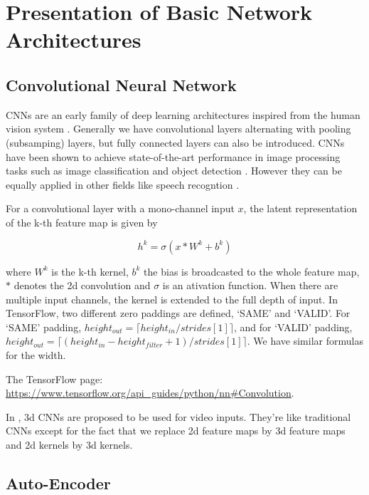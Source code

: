 \section{Presentation of Basic Network Architectures}
\label{section:networks}

\subsection{Convolutional Neural Network}

CNNs are an early family of deep learning
architectures inspired from the human vision system \cite{Y. LeCun 1998}.
Generally we have convolutional layers alternating with pooling
(subsamping) layers, but fully connected layers can also be introduced.
CNNs have been shown to achieve state-of-the-art performance in
image processing tasks such as image classification
\cite{A. Krizhevsky 2012} and object detection \cite{Y. LeCun 2010}.
However they can be equally applied in other fields like speech recogntion
\cite{L. Deng 2013}.

For a convolutional layer with a mono-channel input $x$, the latent
representation of the k-th feature map is given by

\[h^k = \sigma(x\ast W^k + b^k)\]

where $W^k$ is the k-th kernel, $b^k$ the bias is broadcasted to the whole
feature map, $\ast$ denotes the 2d convolution and $\sigma$ is an
ativation function. When there are multiple input channels, the kernel
is extended to the full depth of input. In TensorFlow, two different
zero paddings are defined, `SAME' and `VALID'. For `SAME' padding,
$height_{out} = \lceil height_{in}/strides[1] \rceil$,
and for `VALID' padding,
$height_{out} = \lceil (height_{in}-height_{filter}+1)/strides[1] \rceil$.
We have similar formulas for the width.

The TensorFlow page: 
\href{https://www.tensorflow.org/api_guides/python/nn#Convolution}
{https://www.tensorflow.org/api\_guides/python/nn\#Convolution}.

In \cite{S. Ji 2013}, 3d CNNs are proposed to be used for video inputs.
They're like traditional CNNs except for the fact that we replace
2d feature maps by 3d feature maps and 2d kernels by 3d kernels.

\subsection{Auto-Encoder} \label{subsection:AE}

